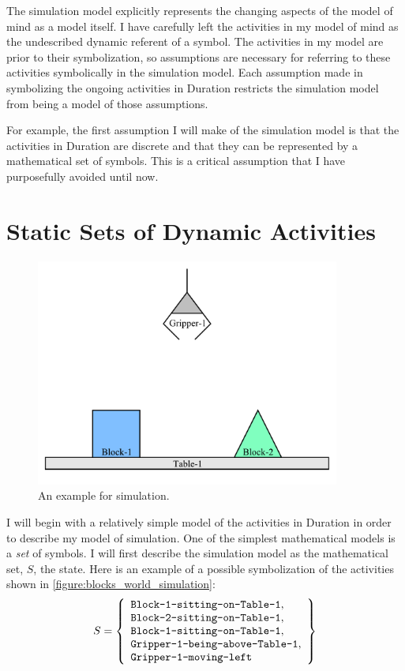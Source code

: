 The simulation model explicitly represents the changing aspects of the
model of mind as a model itself.  I have carefully left the activities
in my model of mind as the undescribed dynamic referent of a symbol.
The activities in my model are prior to their symbolization, so
assumptions are necessary for referring to these activities
symbolically in the simulation model.  Each assumption made in
symbolizing the ongoing activities in Duration restricts the
simulation model from being a model of those assumptions.

For example, the first assumption I will make of the simulation model
is that the activities in Duration are discrete and that they can be
represented by a mathematical set of symbols.  This is a critical
assumption that I have purposefully avoided until now.

\section{Static Sets of Dynamic Activities}

\begin{figure}[bth]
\includegraphics[width=10cm]{gfx/blocks_world_simulation}
\caption{An example for simulation.}
\label{figure:blocks_world_simulation}
\end{figure}

I will begin with a relatively simple model of the activities in
Duration in order to describe my model of simulation.  One of the
simplest mathematical models is a \emph{set} of symbols.  I will first
describe the simulation model as the mathematical set, $S$,
the state.  Here is an example of a possible symbolization of the
activities shown in \autoref{figure:blocks_world_simulation}:
\begin{equation}
\label{equation:example_initial_state}
S =
  \left\{
    \begin{array}{l}
      \text{{\tt Block-1-sitting-on-Table-1}}, \\
      \text{{\tt Block-2-sitting-on-Table-1}}, \\
      \text{{\tt Block-1-sitting-on-Table-1}}, \\
      \text{{\tt Gripper-1-being-above-Table-1}}, \\
      \text{{\tt Gripper-1-moving-left}}
    \end{array}
  \right\}
\end{equation}

